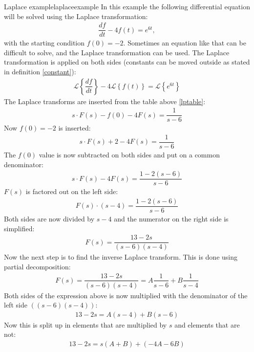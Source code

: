\begin{example}{Laplace example}{laplaceexample}
In this example the following differential equation will be solved using the Laplace transformation:
\begin{align}
\dfrac{df}{dt}-4f(t)=e^{6t}, 	
\end{align} \label{lpexinieq}
with the starting condition $f(0)=-2$. Sometimes an equation like that can be difficult to solve, and the Laplace transformation can be used. The Laplace transformation is applied on both sides (constants can be moved outside as stated in definition \ref{constant}):
\begin{align*}
\mathcal{L} \left\{\dfrac{df}{dt} \right\}-4 
\mathcal{L} \left\{f(t) \right\} = 
\mathcal{L} \left\{e^{6t} \right\}
\end{align*}
The Laplace transforms are inserted from the table above \ref{lptable}:
\begin{align*}
s \cdot F(s) - f(0) - 4F(s)= \dfrac{1}{s-6}
\end{align*}
Now $f(0)=-2$ is inserted:
\begin{align*}
s \cdot F(s) + 2 - 4F(s)= \dfrac{1}{s-6}
\end{align*}
The $f(0)$ value is now subtracted on both sides and put on a common denominator:
\begin{align*}
s \cdot F(s) - 4F(s)= \dfrac{1-2(s-6)}{s-6}
\end{align*}
$F(s)$ is factored out on the left side:
\begin{align*}
F(s) \cdot (s-4) = \dfrac{1-2(s-6)}{s-6}
\end{align*}
Both sides are now divided by $s-4$ and the numerator on the right side is simplified:
\begin{align*}
F(s) = \dfrac{13-2s}{(s-6)(s-4)}
\end{align*}
Now the next step is to find the inverse Laplace transform. This is done using partial decomposition: \cite[p. 537]{calc}
\begin{align}
F(s) = \dfrac{13-2s}{(s-6)(s-4)} = A \dfrac{1}{s-6} + B \dfrac{1}{s-4}
\label{par_dec}
\end{align}
Both sides of the expression above is now multiplied with the denominator of the left side $((s-6)(s-4))$:
\begin{align*}
13-2s = A(s-4) + B(s-6)
\end{align*}
Now this is split up in elements that are multiplied by $s$ and elements that are not:
\begin{align*}
13-2s = s(A+B)+(-4A-6B)

\end{align*}
\end{example}
